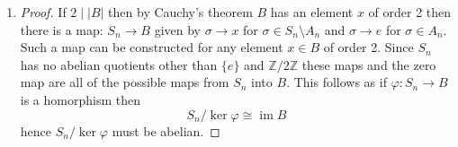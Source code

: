 \documentclass[12pt]{article}
\begin{document}
\begin{enumerate}
    \item[(b)]
    \begin{proof}
         If $2 \mid |B|$ then by Cauchy's theorem $B$ has an element $x$ of order 2
        then there is a map: $S_n \to B$ given by $\sigma \to x$ for $\sigma \in S_n \setminus A_n$ and $\sigma \to e$ for $\sigma \in A_n$. 
        Such a map can be constructed for any element $x \in B$ of order 2. Since $S_n$ has no abelian quotients
        other than $\{ e \}$ and $\mathbb Z / 2\mathbb Z$ these maps and the zero map are all of the possible maps from $S_n$ into $B$.
        This follows as if $\varphi: S_n \to B$ is a homorphism then
        \[ S_n/\ker \varphi \cong \operatorname{im} B \]
        hence $S_n /\ker \varphi$ must be abelian.
    \end{proof}
\end{enumerate}
\end{document}
